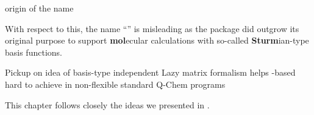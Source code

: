 

origin of the name

With respect to this, the name ``\molsturm'' is misleading
as the package did outgrow its original purpose to support
\textbf{mol}ecular calculations with so-called \textbf{Sturm}ian-type
basis functions.


Pickup on idea of basis-type independent \SCF
Lazy matrix formalism helps
\contraction-based \SCF hard to achieve in non-flexible standard
Q-Chem programs


This chapter follows closely the ideas we presented in \cite{molsturmDesign}.






